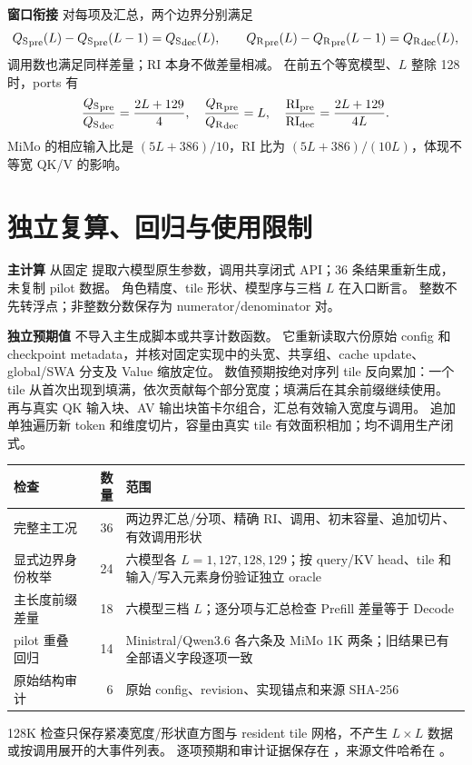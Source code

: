 \documentclass[UTF8,a4paper,11pt]{ctexart}
\newcommand{\qs}{{Q_{\mathrm S}}}\newcommand{\qr}{{Q_{\mathrm R}}}\newcommand{\ri}{\mathrm{RI}}
\newcommand{\para}[1]{\par\textbf{#1}\quad}
\begin{document}
\para{窗口衔接} 对每项及汇总，两个边界分别满足
\[
\qs_{\rm pre}(L)-\qs_{\rm pre}(L-1)=\qs_{\rm dec}(L),\qquad
\qr_{\rm pre}(L)-\qr_{\rm pre}(L-1)=\qr_{\rm dec}(L),
\]
调用数也满足同样差量；RI 本身不做差量相减。
在前五个等宽模型、$L$ 整除 128 时，ports 有
\[
\frac{\qs_{\rm pre}}{\qs_{\rm dec}}=\frac{2L+129}{4},\quad
\frac{\qr_{\rm pre}}{\qr_{\rm dec}}=L,\quad
\frac{\ri_{\rm pre}}{\ri_{\rm dec}}=\frac{2L+129}{4L}.
\]
MiMo 的相应输入比是 $(5L+386)/10$，RI 比为 $(5L+386)/(10L)$，体现不等宽 QK/V 的影响。

\clearpage
\section{独立复算、回归与使用限制}
\para{主计算}  从固定  提取六模型原生参数，调用共享闭式 API；36 条结果重新生成，未复制 pilot 数据。
角色精度、tile 形状、模型序与三档 $L$ 在入口断言。
整数不先转浮点；非整数分数保存为 numerator/denominator 对。

\para{独立预期值}  不导入主生成脚本或共享计数函数。
它重新读取六份原始 config 和 checkpoint metadata，并核对固定实现中的头宽、共享组、cache update、global/SWA 分支及 Value 缩放定位。
数值预期按绝对序列 tile 反向累加：一个 tile 从首次出现到填满，依次贡献每个部分宽度；填满后在其余前缀继续使用。
再与真实 QK 输入块、AV 输出块笛卡尔组合，汇总有效输入宽度与调用。
追加单独遍历新 token 和维度切片，容量由真实 tile 有效面积相加；均不调用生产闭式。

\begin{center}\small
\begin{tabular}{@{}lrp{91mm}@{}}\toprule
检查 & 数量 & 范围\\\midrule
完整主工况 & 36 & 两边界汇总/分项、精确 RI、调用、初末容量、追加切片、有效调用形状\\
显式边界身份枚举 & 24 & 六模型各 $L=1,127,128,129$；按 query/KV head、tile 和输入/写入元素身份验证独立 oracle\\
主长度前缀差量 & 18 & 六模型三档 $L$；逐分项与汇总检查 Prefill 差量等于 Decode\\
pilot 重叠回归 & 14 & Ministral/Qwen3.6 各六条及 MiMo 1K 两条；旧结果已有全部语义字段逐项一致\\
原始结构审计 & 6 & 原始 config、revision、实现锚点和来源 SHA-256\\\bottomrule
\end{tabular}\end{center}
128K 检查只保存紧凑宽度/形状直方图与 resident tile 网格，不产生 $L\times L$ 数据或按调用展开的大事件列表。
逐项预期和审计证据保存在 ，来源文件哈希在 。
\end{document}
